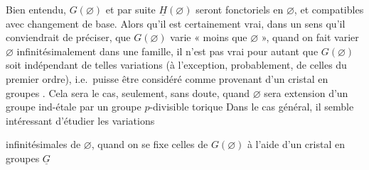 \documentclass[11pt,a4paper]{article}
\begin{document}
Bien entendu, $G(\varnothing)$ et par suite $\underline{H}(\varnothing)$
seront fonctoriels en $\varnothing$, et compatibles avec changement de base.
Alors qu'il est certainement vrai, dans un sens qu'il conviendrait de préciser,
que \struck{\ill{}} $G(\varnothing)$ varie « moins que $\varnothing$ », quand on
fait varier $\varnothing$ infinitésimalement dans une famille, il n'est pas
vrai pour autant que $G(\varnothing)$ soit indépendant de telles variations (à
l'exception, probablement, de celles du premier ordre), i.e.\ puisse être
considéré comme provenant d'un cristal en groupes 
. Cela sera le cas, seulement, sans doute, quand
$\varnothing$ sera extension d'un groupe  ind-étale par un
groupe $p$-divisible torique
\supplied{(}Dans le cas général, il semble intéressant d'étudier les
variations

infinitésimales de $\varnothing$, quand on se fixe celles de $G(\varnothing)$ à
l'aide d'un cristal en groupes $\underline{G}$
\end{document}
